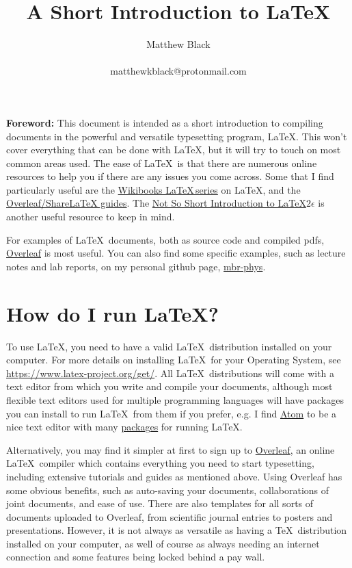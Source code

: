\documentclass[a4paper]{article}
\title{A Short Introduction to \LaTeX}
\author{Matthew Black \\ \\ matthewkblack@protonmail.com}
\date{}
\begin{document}
\maketitle

\textbf{Foreword:} This document is intended as a short introduction to compiling documents in the powerful and versatile typesetting program, \LaTeX. 
This won't cover everything that can be done with \LaTeX, but it will try to touch on most common areas used. 
The ease of \LaTeX\, is that there are numerous online resources to help you if there are any issues you come across. 
Some that I find particularly useful are the \href{https://en.wikibooks.org/wiki/LaTeX}{Wikibooks \LaTeX\,series} on \LaTeX, and the \href{https://www.overleaf.com/learn}{Overleaf/ShareLaTeX guides}.
The \href{https://tobi.oetiker.ch/lshort/lshort.pdf}{Not So Short Introduction to \LaTeX $2\epsilon$} is another useful resource to keep in mind. 

For examples of \LaTeX\, documents, both as source code and compiled pdfs, \href{https://www.overleaf.com/}{Overleaf} is most useful. 
You can also find some specific examples, such as lecture notes and lab reports, on my personal github page, \href{https://github.com/mbr-phys}{mbr-phys}.

\section{How do I run \LaTeX?}
To use \LaTeX, you need to have a valid \LaTeX\, distribution installed on your computer. 
For more details on installing \LaTeX\, for your Operating System, see \href{https://www.latex-project.org/get/}{https://www.latex-project.org/get/}.
All \LaTeX\, distributions will come with a text editor from which you write and compile your documents, although most flexible text editors used for multiple programming languages will have packages you can install to run \LaTeX\, from them if you prefer, e.g. I find \href{atom.io}{Atom} to be a nice text editor with many \href{https://atom.io/packages/search?q=latex}{packages} for running \LaTeX.

Alternatively, you may find it simpler at first to sign up to \href{https://www.overleaf.com/}{Overleaf}, an online \LaTeX\, compiler which contains everything you need to start typesetting, including extensive tutorials and guides as mentioned above. 
Using Overleaf has some obvious benefits, such as auto-saving your documents, collaborations of joint documents, and ease of use. 
There are also templates for all sorts of documents uploaded to Overleaf, from scientific journal entries to posters and presentations.
However, it is not always as versatile as having a \TeX\, distribution installed on your computer, as well of course as always needing an internet connection and some features being locked behind a pay wall. 
\end{document}
